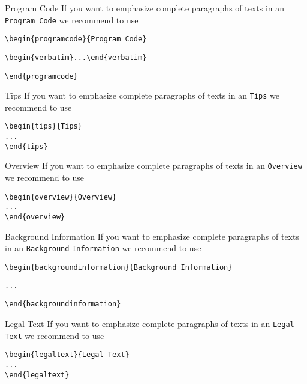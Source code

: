 \documentclass[graybox]{svmult}
\begin{document}
\begin{programcode}{Program Code}
If you want to emphasize complete paragraphs of texts in an \verb|Program Code| we recommend to
use

\verb|\begin{programcode}{Program Code}|

\verb|\begin{verbatim}...\end{verbatim}|

\verb|\end{programcode}|

\end{programcode}
%
\begin{tips}{Tips}
If you want to emphasize complete paragraphs of texts in an \verb|Tips| we recommend to
use  \begin{verbatim}\begin{tips}{Tips}
...
\end{tips}\end{verbatim}
\end{tips}
\eject
%
\begin{overview}{Overview}
If you want to emphasize complete paragraphs of texts in an \verb|Overview| we recommend to
use  \begin{verbatim}\begin{overview}{Overview}
...
\end{overview}\end{verbatim}
\end{overview}
\begin{backgroundinformation}{Background Information}
If you want to emphasize complete paragraphs of texts in an \verb|Background|
\verb|Information| we recommend to
use

\verb|\begin{backgroundinformation}{Background Information}|

\verb|...|

\verb|\end{backgroundinformation}|
\end{backgroundinformation}
\begin{legaltext}{Legal Text}
If you want to emphasize complete paragraphs of texts in an \verb|Legal Text| we recommend to
use  \begin{verbatim}\begin{legaltext}{Legal Text}
...
\end{legaltext}\end{verbatim}
\end{legaltext}
\end{document}
